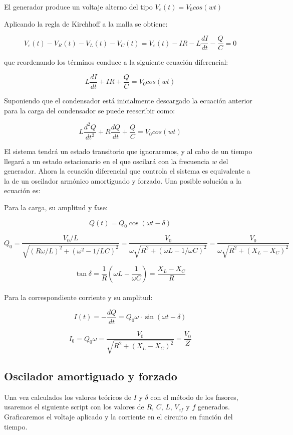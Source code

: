 \documentclass{article}
\begin{document}
    El generador produce un voltaje alterno del tipo $V_{\varepsilon}(t)=V_0 cos(wt)$
    
    Aplicando la regla de Kirchhoff a la malla se obtiene:
    
    \[V_{\varepsilon}(t)-V_R(t)-V_L(t)-V_C(t)=V_{\varepsilon}(t)-IR-L \frac{dI}{dt}-\frac{Q}{C}=0\]
    
    que reordenando los términos conduce a la siguiente ecuación diferencial:
    
    \[L \frac{dI}{dt}+ IR+ \frac{Q}{C}= V_0 cos(wt)\]
    
    Suponiendo que el condensador está inicialmente descargado la ecuación anterior para la carga del condensador se puede reescribir como:
    
    \[L \frac{d^2Q}{dt^2}+R \frac{dQ}{dt}+ \frac{Q}{C}= V_0 cos(wt)\]
    
    El sistema tendrá un estado transitorio que ignoraremos, y al cabo de un tiempo llegará a un estado estacionario en el que oscilará con la frecuencia $w$ del generador. Ahora la ecuación diferencial que controla el sistema es equivalente a la de un oscilador armónico amortiguado y forzado. Una posible solución a la ecuación es:
    
    Para la carga, su amplitud y fase:
    
    \[Q(t)=Q_0 \cos{(\omega t - \delta)}\]
    
    \[Q_0= \frac{V_0/L}{\sqrt{(R\omega/L)^2+(\omega^2-1/LC)^2}} =\frac{V_0}{\omega \sqrt{R^2+(\omega L-1/\omega C)^2 }}=\frac{V_0}{\omega \sqrt{R^2+(X_L-X_C)^2}}\]
    
    \[\tan{\delta}=\frac{1}{R}(\omega L- \frac{1}{\omega C})=\frac{X_L-X_C}{R}\]\\
    
    Para la correspondiente corriente y su amplitud:
    
    \[I(t)=- \frac{dQ}{dt}= Q_0 \omega · \sin{(\omega t - \delta)}\]

    \[I_0= Q_0 \omega = \frac{V_0}{\sqrt{R^2+(X_L-X_C)^2}}= \frac{V_0}{Z}\]
    
    \hfill
    \subsection{Oscilador amortiguado y forzado}
    Una vez calculados los valores teóricos de $I$ y $\delta$ con el método de los fasores, usaremos el siguiente script con los valores de $R$, $C$, $L$, $V_{ef}$ y $f$ generados. Graficaremos el voltaje aplicado y la corriente en el circuito en función del tiempo. \\
\end{document}
